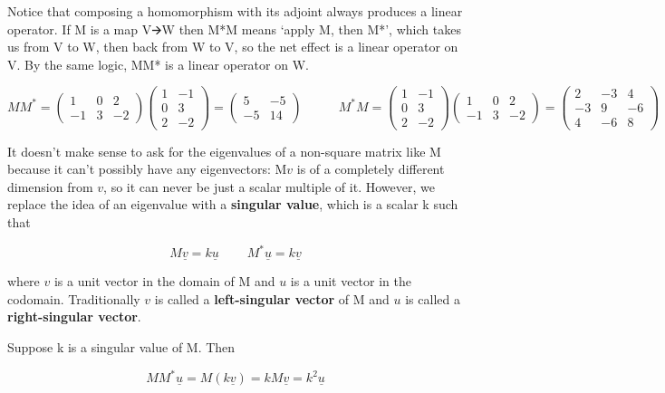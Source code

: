\documentclass[oneside,english]{amsbook}
\numberwithin{section}{chapter}
\theoremstyle{plain}
\theoremstyle{definition}
\begin{document}
Notice that composing a homomorphism with its adjoint always produces a
linear operator. If M is a map V🡪W then M*M means `apply M, then M*',
which takes us from V to W, then back from W to V, so the net effect is
a linear operator on V. By the same logic, MM* is a linear operator on
W.

\[MM^{*} = \begin{pmatrix}
	1 & 0 & 2 \\
	- 1 & 3 & - 2
\end{pmatrix}\begin{pmatrix}
	1 & - 1 \\
	0 & 3 \\
	2 & - 2
\end{pmatrix} = \begin{pmatrix}
	5 & - 5 \\
	- 5 & 14
\end{pmatrix}\ \ \ \ \ \ \ \ \ \ \ \ \ M^{*}M = \begin{pmatrix}
	1 & - 1 \\
	0 & 3 \\
	2 & - 2
\end{pmatrix}\begin{pmatrix}
	1 & 0 & 2 \\
	- 1 & 3 & - 2
\end{pmatrix} = \begin{pmatrix}
	2 & - 3 & 4 \\
	- 3 & 9 & - 6 \\
	4 & - 6 & 8
\end{pmatrix}\]

It doesn't make sense to ask for the eigenvalues of a non-square matrix
like M because it can't possibly have any eigenvectors: M$v$ is of a
completely different dimension from $v$, so it can never be just a
scalar multiple of it. However, we replace the idea of an eigenvalue
with a \textbf{singular value}, which is a scalar k such that

\[M\underline{v} = k\underline{u}\ \ \ \ \ \ \ \ \ \ M^{*}\underline{u} = k\underline{v}\]

where $v$ is a unit vector in the domain of M and $u$ is a unit
vector in the codomain. Traditionally $v$ is called a
\textbf{left-singular vector} of M and $u$ is called a
\textbf{right-singular vector}.

Suppose k is a singular value of M. Then

\[{MM^{*}\underline{u} = M\left( k\underline{v} \right)
}{= kM\underline{v}
}{= k^{2}\underline{u}}\]
\end{document}
